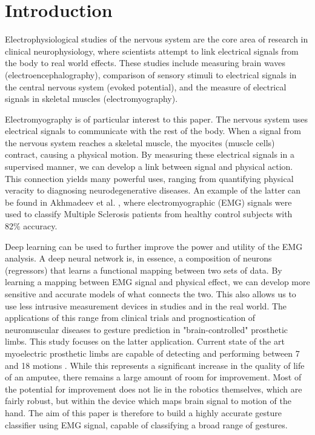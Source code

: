 \section{Introduction}

Electrophysiological studies of the nervous system are the core area of research in clinical neurophysiology, where scientists attempt to link electrical signals from the body to real world effects. These studies include measuring brain waves (electroencephalography), comparison of sensory stimuli to electrical signals in the central nervous system (evoked potential), and the measure of electrical signals in skeletal muscles (electromyography). \par
Electromyography is of particular interest to this paper. The nervous system uses electrical signals to communicate with the rest of the body. When a signal from the nervous system reaches a skeletal muscle, the myocites (muscle cells) contract, causing a physical motion. By measuring these electrical signals in a supervised manner, we can develop a link between signal and physical action. This connection yields many powerful uses, ranging from quantifying physical veracity to diagnosing neurodegenerative diseases. An example of the latter can be found in Akhmadeev et al. \cite{graves}, where electromyographic (EMG) signals were used to classify Multiple Sclerosis patients from healthy control subjects with 82\% accuracy. \par
Deep learning can be used to further improve the power and utility of the EMG analysis. A deep neural network is, in essence, a composition of neurons (regressors) that learns a functional mapping between two sets of data. By learning a mapping between EMG signal and physical effect, we can develop more sensitive and accurate models of what connects the two. This also allows us to use less intrusive measurement devices in studies and in the real world. The applications of this range from clinical trials and prognostication of neuromuscular diseases to gesture prediction in "brain-controlled" prosthetic limbs. This study focuses on the latter application.
Current state of the art myoelectric prosthetic limbs  are capable of detecting and performing between 7 and 18 motions \cite{myohandpro} \cite{ottoblock}. While this represents a significant increase in the quality of life of an amputee, there remains a large amount of room for improvement. Most of the potential for improvement does not lie in the robotics themselves, which are fairly robust, but within the device which maps brain signal to motion of the hand. The aim of this paper is therefore to build a highly accurate gesture classifier using EMG signal, capable of classifying a broad range of gestures. \par
